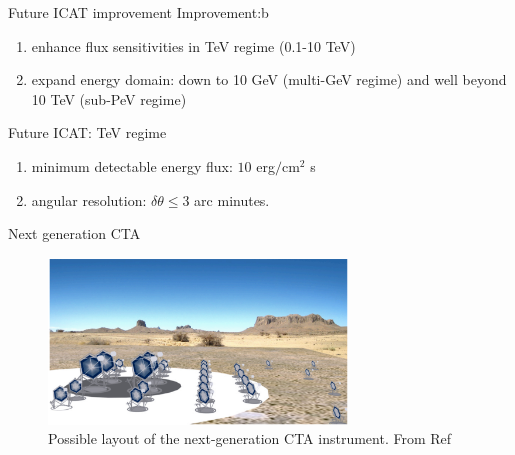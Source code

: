 \documentclass{beamer}
\begin{document}
\begin{frame}{Future ICAT improvement}
	Improvement:b
	\begin{enumerate}
		\item enhance flux sensitivities in TeV regime (0.1-10 TeV)
		\item expand energy domain: down to 10 GeV (multi-GeV regime) and well beyond 10 TeV (sub-PeV regime)

	\end{enumerate}
\end{frame}


\begin{frame}{Future ICAT: TeV regime}
	\begin{enumerate}
		\item minimum detectable energy flux: $10$ erg$/ \text{cm}^2 $ s
		\item angular resolution: $\delta \theta \leq 3$ arc minutes.
	\end{enumerate}
\end{frame}


\begin{frame}{Next generation CTA}
	\begin{figure}[h]
		\includegraphics[width=300px]{next-generationCTA.png}
		\caption{Possible layout of the next-generation CTA instrument.
		From Ref}
	\end{figure}
\end{frame}
\end{document}
